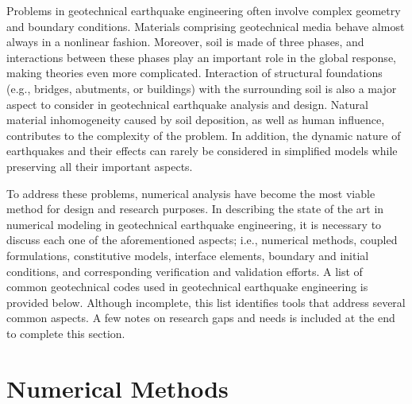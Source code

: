 Problems in geotechnical earthquake engineering often involve complex geometry and boundary conditions. Materials comprising geotechnical media behave almost always in a nonlinear fashion. Moreover, soil is made of three phases, and interactions between these phases play an important role in the global response, making theories even more complicated. Interaction of structural foundations (e.g., bridges, abutments, or buildings) with the surrounding soil is also a major aspect to consider in geotechnical earthquake analysis and design. Natural material inhomogeneity caused by soil deposition, as well as human influence, contributes to the complexity of the problem. In addition, the dynamic nature of earthquakes and their effects can rarely be considered in simplified models while preserving all their important aspects.

To address these problems, numerical analysis have become the most viable method for design and research purposes. In describing the state of the art in numerical modeling in geotechnical earthquake engineering, it is necessary to discuss each one of the aforementioned aspects; i.e., numerical methods, coupled formulations, constitutive models, interface elements, boundary and initial conditions, and corresponding verification and validation efforts. A list of common geotechnical codes used in geotechnical earthquake engineering is provided below. Although incomplete, this list identifies tools that address several common aspects. A few notes on research gaps and needs is included at the end to complete this section. 

\section{Numerical Methods}
\label{sec:resp_geotech_1}

